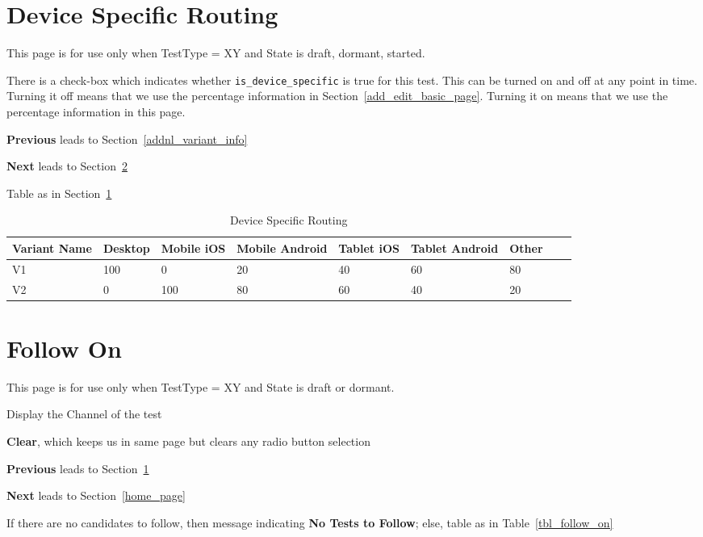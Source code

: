 \documentclass[letterpaper]{article}
\begin{document}
\section{Device Specific Routing}
\label{device_specific}
This page is for use only when TestType = XY and State is draft, dormant,
started. 
\be
\item There is a check-box which indicates whether 
  \verb+is_device_specific+ is true for this test. This can be turned on and off
  at any point in time. Turning it off means that we use the percentage
  information in Section~\ref{add_edit_basic_page}. Turning it on means that we use the
  percentage information in this page.
\item {\bf Previous} leads to Section~\ref{addnl_variant_info}
\item {\bf Next} leads to Section~\ref{follow_on}
\item Table as in Section~\ref{tbl_device_specific}
  \ee
\begin{table}[hb]
\centering
\begin{tabular}{|l||l|l|l|l|l|l|l|l|}  \hline \hline
  {\bf Variant Name} & 
  {\bf Desktop} & 
  {\bf Mobile iOS}  &
  {\bf Mobile Android}  & 
  {\bf Tablet iOS}  & 
  Tablet {\bf Android}  &
  Other \\ \hline \hline
  V1 & 100  & 0   & 20 & 40 & 60 & 80 \\ \hline
  V2 & 0    & 100 &  80 & 60 & 40 & 20 \\ \hline
\hline
\end{tabular}
\caption{Device Specific Routing}
\label{tbl_device_specific}
\end{table}

\section{Follow On}
\label{follow_on}
This page is for use only when TestType = XY and State is draft or dormant.
\be
\item Display the Channel of the test
\item {\bf Clear}, which keeps us in same page but clears any radio button
  selection
\item {\bf Previous} leads to Section~\ref{device_specific}
\item {\bf Next} leads to Section~\ref{home_page}
\item If there are no candidates to follow, then message indicating {\bf No
  Tests to Follow}; else, table as in Table~\ref{tbl_follow_on}
  \ee
\end{document}
